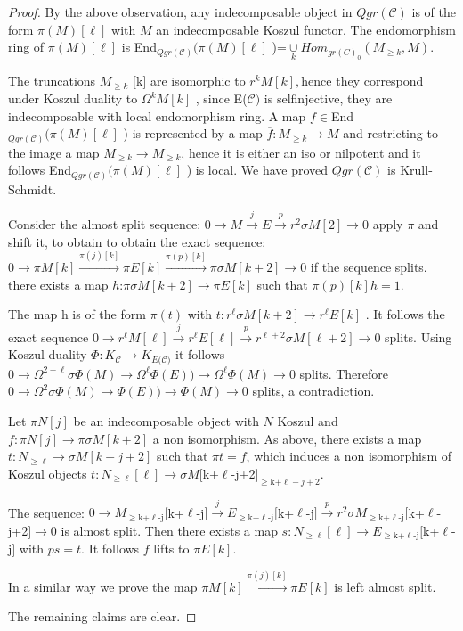 \documentclass{amsart}
\theoremstyle{plain}
\numberwithin{equation}{section}
\begin{document}
\begin{proof}
By the above observation, any indecomposable object in $Qgr(\mathcal{C})$ is
of the form $\pi (M)[\ell ]$ with $M$ an indecomposable Koszul functor. The
endomorphism ring of $\pi (M)[\ell ]$ is End$_{Qgr(\mathcal{C})}(\pi
(M)[\ell ]$ )=$\underset{k}{\cup }Hom_{gr(C)_{0}}(M_{\geq k},M).$

The truncations $M_{\geq k}$ [k] are isomorphic to $r^{k}M[k],$hence they
correspond under Koszul duality to $\Omega ^{k}M[k]$ , since E($\mathcal{C)}$
is selfinjective, they are indecomposable with local endomorphism ring. A
map $f\in $End$_{Qgr(\mathcal{C})}(\pi (M)[\ell ]$ ) is represented by a map
$\overline{f}:M_{\geq k}\rightarrow M$ and restricting to the image a map $M_{\geq k}\rightarrow M_{\geq k}$, hence it is either an iso or nilpotent
and it follows End$_{Qgr(\mathcal{C})}(\pi (M)[\ell ]$ ) is local. We have
proved $Qgr(\mathcal{C})$ is Krull-Schmidt.

Consider the almost split sequence: $0\rightarrow M\overset{j}{\rightarrow }E\overset{p}{\rightarrow }r^{2}\sigma M[2]\rightarrow 0$ apply $\pi $ and
shift it, to obtain to obtain the exact sequence: $0\rightarrow \pi M[k]\overset{\pi (j)[k]}{\rightarrow }\pi E[k]\overset{\pi (p)[k]}{\rightarrow }\pi \sigma M[k+2]\rightarrow 0$ if the sequence splits. there exists a map $h $:$\pi \sigma M[k+2]\rightarrow \pi E[k]$ such that $\pi (p)[k]h=1.$

The map h is of the form $\pi (t)$ with $t:r^{\ell }\sigma M[k+2]\rightarrow
r^{\ell }E[k]$ . It follows the exact sequence $0\rightarrow r^{\ell }M[\ell
]\overset{j}{\rightarrow }r^{\ell }E[\ell ]\overset{p}{\rightarrow }r^{\ell
+2}\sigma M[\ell +2]\rightarrow 0$ splits. Using Koszul duality $\Phi :K_{\mathcal{C}}\rightarrow K_{E(\mathcal{C)}}$ it follows $0\rightarrow \Omega
^{2+\ell }\sigma \Phi (M)\rightarrow \Omega ^{\ell }\Phi (E))\rightarrow
\Omega ^{\ell }\Phi (M)\rightarrow 0$ splits. Therefore $0\rightarrow \Omega
^{2}\sigma \Phi (M)\rightarrow \Phi (E))\rightarrow \Phi (M)\rightarrow 0$
splits, a contradiction.

Let $\pi N[j]$ be an indecomposable object with $N$ Koszul and $f:\pi
N[j]\rightarrow \pi \sigma M[k+2]$ a non isomorphism. As above, there exists
a map $t:N_{\geq \ell }\rightarrow \sigma M[k-j+2]$ such that $\pi t=f$,
which induces a non isomorphism of Koszul objects $t:N_{\geq \ell }[\ell
]\rightarrow \sigma M[$k+$\ell $-j+2$]_{\geq \text{k+}\ell -j+2}.$

The sequence: $0\rightarrow M_{\geq \text{k+}\ell \text{-j}}[$k+$\ell $-j$]\overset{j}{\rightarrow }E_{\geq \text{k+}\ell \text{-j}}[$k+$\ell $-j$]\overset{p}{\rightarrow }r^{2}\sigma M_{\geq \text{k+}\ell \text{-j}}[$k+$\ell $-j+2$]\rightarrow 0$ is almost split. Then there exists a map $s:N_{\geq \ell }[\ell ]\rightarrow E_{\geq \text{k+}\ell \text{-j}}[$k+$\ell
$-j$]$ with $ps=t$. It follows $f$ lifts to $\pi E[k]$.

In a similar way we prove the map $\pi M[k]\overset{\pi (j)[k]}{\rightarrow }\pi E[k]$ is left almost split.

The remaining claims are clear.
\end{proof}
\end{document}

